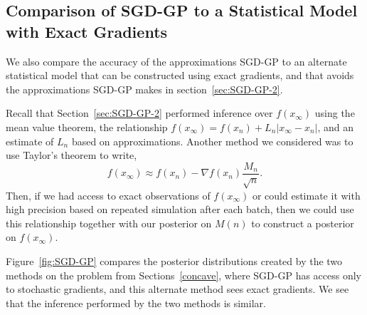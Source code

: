 \documentclass{wscpaperproc}
\theoremstyle{wsc}
\begin{document}
\subsection{Comparison of SGD-GP to a Statistical Model with Exact Gradients}
We also compare the accuracy of the approximations SGD-GP to an alternate statistical model that can be constructed using exact gradients, and that avoids the approximations SGD-GP makes in section~\ref{sec:SGD-GP-2}.

Recall that Section~\ref{sec:SGD-GP-2} performed inference over $f(x_\infty)$ using the mean value theorem, the relationship $f\left(x_{\infty}\right)=f\left(x_{n}\right)+L_{n}\left|x_{\infty}-x_{n}\right|$, and an estimate of $L_n$ based on approximations.
Another method we considered was to use Taylor's theorem to write,
\[
f\left(x_{\infty}\right)\approx f\left(x_{n}\right)-\nabla f\left(x_{n}\right)\frac{M_{n}}{\sqrt{n}}.
\]
Then, if we had access to exact observations of $f(x_\infty)$ or could estimate it with high precision based on repeated simulation after each batch, then we could use this relationship together with our posterior on $M(n)$ to construct a posterior on $f(x_\infty)$.

Figure~\ref{fig:SGD-GP} compares the posterior distributions created by the two methods on the problem from Sections~\ref{concave}, where SGD-GP has access only to stochastic gradients, and this alternate method sees exact gradients.  We see that the inference performed by the two methods is similar.
\end{document}
